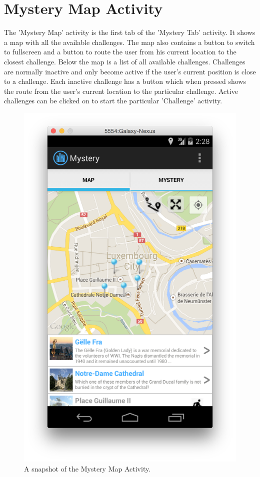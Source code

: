 \section{Mystery Map Activity}

The 'Mystery Map' activity is the first tab of the 'Mystery Tab' activity. It shows a map with all the available challenges. The map also contains a button to switch to fullscreen and a button to route the user from his current location to the closest challenge. Below the map is a list of all available challenges. Challenges are normally inactive and only become active if the user's current position is close to a challenge. Each inactive challenge has a button which when pressed shows the route from the user's current location to the particular challenge. Active challenges can be clicked on to start the particular 'Challenge' activity.

\begin{figure}[H]
	\centering
	\includegraphics[scale=0.4]{Figures/MysteryMapActivity}
	\caption{A snapshot of the Mystery Map Activity.}
\end{figure}

